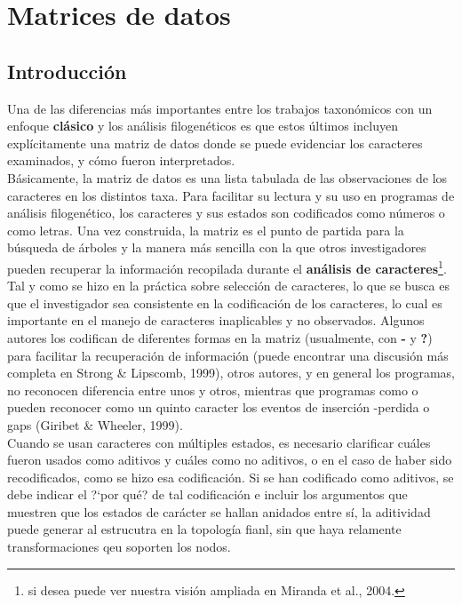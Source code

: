 \chapter{Matrices de datos}

\section*{Introducci\'on} 

Una de las diferencias m\'as importantes entre los trabajos taxon\'omicos con un enfoque \textbf{cl\'asico} y los an\'alisis filogen\'eticos es que estos \'ultimos incluyen expl\'icitamente una matriz de datos donde se puede evidenciar los caracteres examinados, y c\'omo fueron interpretados.\\

B\'asicamente, la matriz de datos es una lista tabulada de las observaciones de los caracteres en los distintos taxa. Para facilitar su lectura y su uso en programas de an\'alisis filogen\'etico, los caracteres y sus estados son codificados como n\'umeros o como letras. Una vez construida, la matriz es el punto de partida para la b\'usqueda de \'arboles y la manera m\'as sencilla con la que otros investigadores pueden recuperar la informaci\'on recopilada durante el \textbf{an\'alisis de caracteres}\footnote{si desea puede ver nuestra visi\'on ampliada en Miranda et al., 2004.}.\\

Tal y como se hizo en la pr\'actica sobre selecci\'on de caracteres, lo que se busca es que el investigador sea consistente en la codificaci\'on de los caracteres, lo cual es importante en el manejo de caracteres inaplicables y no observados. Algunos autores los codifican de diferentes formas en la matriz (usualmente, con \textbf {-} y \textbf {?}) para facilitar la recuperaci\'on de informaci\'on (puede encontrar una discusi\'on m\'as completa en Strong \& Lipscomb, 1999),  otros autores, y en general los programas, no reconocen diferencia entre unos y otros, mientras que programas como  o  pueden reconocer como un quinto caracter los eventos de inserci\'on -perdida o gaps (Giribet \& Wheeler, 1999).\\
%

Cuando se usan caracteres con m\'ultiples estados, es necesario clarificar cu\'ales fueron usados como aditivos y cu\'ales como no aditivos, o en el caso de haber sido recodificados, como se hizo esa codificaci\'on. Si se han codificado como aditivos, se debe indicar el ?`por qu\'e? de tal codificaci\'on e incluir los argumentos que muestren que los estados de car\'acter se hallan anidados entre s\'i, la aditividad puede generar al estrucutra en la topolog\'ia fianl, sin que haya relamente transformaciones qeu soporten los nodos.\\



